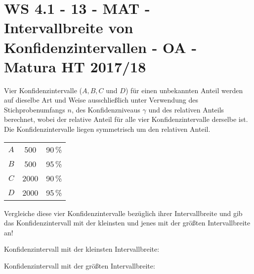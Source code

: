 \section{WS 4.1 - 13 - MAT - Intervallbreite von Konfidenzintervallen - OA - Matura HT 2017/18}

\begin{beispiel}[WS 4.1]{1} %
Vier Konfidenzintervalle ($A, B, C$ und $D$) für einen unbekannten Anteil werden auf dieselbe Art und Weise ausschließlich unter Verwendung des Stichprobenumfangs $n$, des Konfidenzniveaus $\gamma$ und des relativen Anteils berechnet, wobei der relative Anteil für alle vier Konfidenzintervalle derselbe ist. Die Konfidenzintervalle liegen symmetrisch um den relativen Anteil.

\begin{center}
	\begin{tabular}{|c|c|c|}\hline
	\cellcolor[gray]{0.9}{Konfidenzintervall}&\cellcolor[gray]{0.9}{Stichprobenumfang $n$}&\cellcolor[gray]{0.9}{Konfidenzniveau $\sigma$}\\ \hline
	$A$&500&90\,\%\\ \hline
	$B$&500&95\,\%\\ \hline
	$C$&2000&90\,\%\\ \hline
	$D$&2000&95\,\%\\ \hline
	\end{tabular}
\end{center}

Vergleiche diese vier Konfidenzintervalle bezüglich ihrer Intervallbreite und gib das Konfidenzintervall mit der kleinsten und jenes mit der größten Intervallbreite an!\leer

Konfidenzintervall mit der kleinsten Intervallbreite: \leer

Konfidenzintervall mit der größten Intervallbreite: 
\end{beispiel}